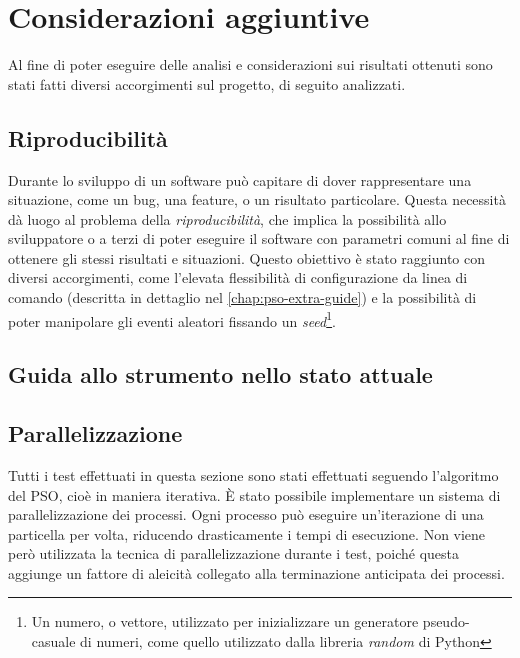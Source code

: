 \section{Considerazioni aggiuntive}
\label{chap:pso-extra}
Al fine di poter eseguire delle analisi e considerazioni sui risultati ottenuti sono stati fatti diversi accorgimenti sul progetto, di seguito analizzati.

\subsection{Riproducibilità}
\label{chap:pso-extra-ripro}
Durante lo sviluppo di un software può capitare di dover rappresentare una situazione, come un bug, una feature, o un risultato particolare. Questa necessità dà luogo al problema della \textit{riproducibilità}, che implica la possibilità allo sviluppatore o a terzi di poter eseguire il software con parametri comuni al fine di ottenere gli stessi risultati e situazioni. Questo obiettivo è stato raggiunto con diversi accorgimenti, come l'elevata flessibilità di configurazione da linea di comando (descritta in dettaglio nel \autoref{chap:pso-extra-guide}) e la possibilità di poter manipolare gli eventi aleatori fissando un \textit{seed}\footnote{Un numero, o vettore, utilizzato per inizializzare un generatore pseudo-casuale di numeri, come quello utilizzato dalla libreria \textit{random} di Python}.

\subsection{Guida allo strumento nello stato attuale}
\label{chap:pso-extra-guide}

\subsection{Parallelizzazione}
\label{chap:pso-extra-paral}
Tutti i test effettuati in questa sezione sono stati effettuati seguendo l'algoritmo del PSO, cioè in maniera iterativa. È stato possibile implementare un sistema di parallelizzazione dei processi. Ogni processo può eseguire un'iterazione di una particella per volta, riducendo drasticamente i tempi di esecuzione.
Non viene però utilizzata la tecnica di parallelizzazione durante i test, poiché questa aggiunge un fattore di aleicità collegato alla terminazione anticipata dei processi.